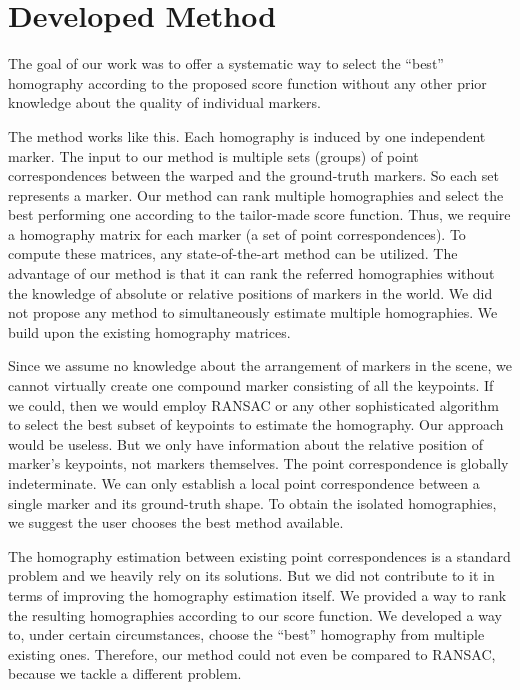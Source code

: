 \section{Developed Method}
\label{sec:HomographyDevelopedMethod}

The goal of our work was to offer a systematic way to select the ``best'' homography according to the proposed score function without any other prior knowledge about the quality of individual markers.

The method works like this. Each homography is induced by one independent marker. The input to our method is multiple sets (groups) of point correspondences between the warped and the ground-truth markers. So each set represents a marker. Our method can rank multiple homographies and select the best performing one according to the tailor-made score function. Thus, we require a homography matrix for each marker (a set of point correspondences). To compute these matrices, any state-of-the-art method can be utilized. The advantage of our method is that it can rank the referred homographies without the knowledge of absolute or relative positions of markers in the world. We did not propose any method to simultaneously estimate multiple homographies. We build upon the existing homography matrices.

Since we assume no knowledge about the arrangement of markers in the scene, we cannot virtually create one compound marker consisting of all the keypoints. If we could, then we would employ RANSAC or any other sophisticated algorithm to select the best subset of keypoints to estimate the homography. Our approach would be useless. But we only have information about the relative position of marker’s keypoints, not markers themselves. The point correspondence is globally indeterminate. We can only establish a local point correspondence between a single marker and its ground-truth shape. To obtain the isolated homographies, we suggest the user chooses the best method available.

The homography estimation between existing point correspondences is a standard problem and we heavily rely on its solutions. But we did not contribute to it in terms of improving the homography estimation itself. We provided a way to rank the resulting homographies according to our score function. We developed a way to,
under certain circumstances, choose the ``best'' homography from multiple existing ones. Therefore, our method could not even be compared to RANSAC, because we tackle a different problem.

